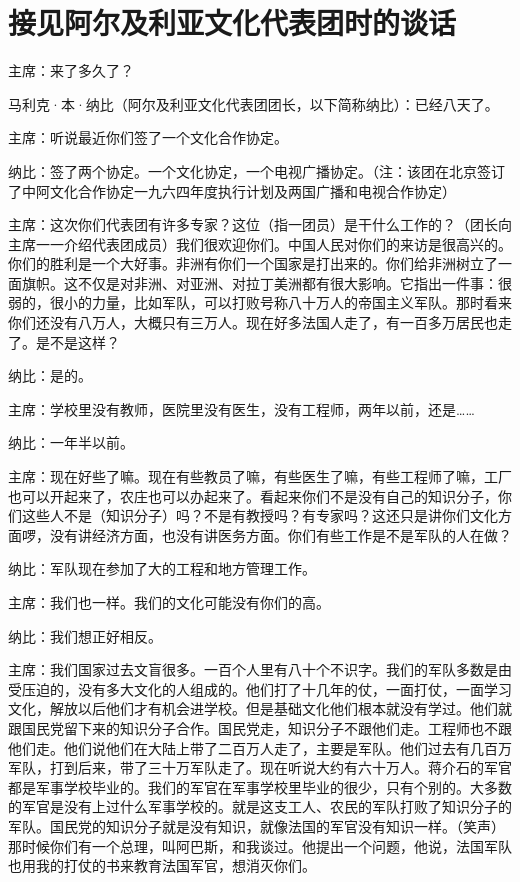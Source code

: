 \section[接见阿尔及利亚文化代表团时的谈话（一九六四年四月十五日）]{接见阿尔及利亚文化代表团时的谈话}


主席：来了多久了？

马利克·本·纳比（阿尔及利亚文化代表团团长，以下简称纳比）：已经八天了。

主席：听说最近你们签了一个文化合作协定。

纳比：签了两个协定。一个文化协定，一个电视广播协定。（注：该团在北京签订了中阿文化合作协定一九六四年度执行计划及两国广播和电视合作协定）

主席：这次你们代表团有许多专家？这位（指一团员）是干什么工作的？（团长向主席一一介绍代表团成员）我们很欢迎你们。中国人民对你们的来访是很高兴的。你们的胜利是一个大好事。非洲有你们一个国家是打出来的。你们给非洲树立了一面旗帜。这不仅是对非洲、对亚洲、对拉丁美洲都有很大影响。它指出一件事：很弱的，很小的力量，比如军队，可以打败号称八十万人的帝国主义军队。那时看来你们还没有八万人，大概只有三万人。现在好多法国人走了，有一百多万居民也走了。是不是这样？

纳比：是的。

主席：学校里没有教师，医院里没有医生，没有工程师，两年以前，还是……

纳比：一年半以前。

主席：现在好些了嘛。现在有些教员了嘛，有些医生了嘛，有些工程师了嘛，工厂也可以开起来了，农庄也可以办起来了。看起来你们不是没有自己的知识分子，你们这些人不是（知识分子）吗？不是有教授吗？有专家吗？这还只是讲你们文化方面啰，没有讲经济方面，也没有讲医务方面。你们有些工作是不是军队的人在做？

纳比：军队现在参加了大的工程和地方管理工作。

主席：我们也一样。我们的文化可能没有你们的高。

纳比：我们想正好相反。

主席：我们国家过去文盲很多。一百个人里有八十个不识字。我们的军队多数是由受压迫的，没有多大文化的人组成的。他们打了十几年的仗，一面打仗，一面学习文化，解放以后他们才有机会进学校。但是基础文化他们根本就没有学过。他们就跟国民党留下来的知识分子合作。国民党走，知识分子不跟他们走。工程师也不跟他们走。他们说他们在大陆上带了二百万人走了，主要是军队。他们过去有几百万军队，打到后来，带了三十万军队走了。现在听说大约有六十万人。蒋介石的军官都是军事学校毕业的。我们的军官在军事学校里毕业的很少，只有个别的。大多数的军官是没有上过什么军事学校的。就是这支工人、农民的军队打败了知识分子的军队。国民党的知识分子就是没有知识，就像法国的军官没有知识一样。（笑声）那时候你们有一个总理，叫阿巴斯，和我谈过。他提出一个问题，他说，法国军队也用我的打仗的书来教育法国军官，想消灭你们。


